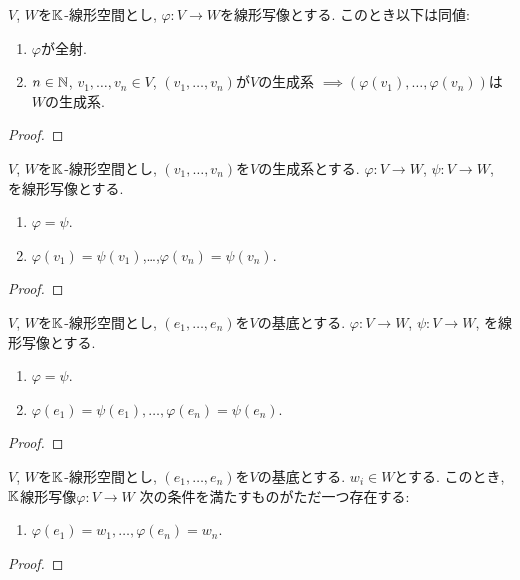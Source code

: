 \begin{prop}
  $V$, $W$を$\mathbb{K}$-線形空間とし,
  $\varphi\colon V\to W$を線形写像とする.
  このとき以下は同値:
  \begin{enumerate}
  \item $\varphi$が全射.
  \item $n\in \mathbb{N}$, $v_1,\ldots,v_n\in V$,
    $(v_1,\ldots,v_n)$が$V$の生成系
    $\implies (\varphi(v_1),\ldots,\varphi(v_n))$は$W$の生成系.
  \end{enumerate}
\end{prop}
\begin{proof}\end{proof}

\begin{prop}
  $V$, $W$を$\mathbb{K}$-線形空間とし,
  $(v_1,\ldots,v_n)$を$V$の生成系とする.
  $\varphi\colon V\to W$,
  $\psi\colon V\to W$,
  を線形写像とする.
  \begin{enumerate}
  \item $\varphi=\psi$.
  \item $\varphi(v_1)=\psi(v_1)$,\ldots,$\varphi(v_n)=\psi(v_n)$.
  \end{enumerate}
\end{prop}
\begin{proof}\end{proof}

\begin{cor}
  $V$, $W$を$\mathbb{K}$-線形空間とし,
  $(e_1,\ldots,e_n)$を$V$の基底とする.
  $\varphi\colon V\to W$,
  $\psi\colon V\to W$,
  を線形写像とする.
  \begin{enumerate}
  \item $\varphi=\psi$.
  \item $\varphi(e_1)=\psi(e_1),\ldots,\varphi(e_n)=\psi(e_n)$.
  \end{enumerate}
\end{cor}
\begin{proof}\end{proof}

\begin{cor}
  $V$, $W$を$\mathbb{K}$-線形空間とし,
  $(e_1,\ldots,e_n)$を$V$の基底とする.
  $w_i\in W$とする.
  このとき,
  $\mathbb{K}$線形写像$\varphi\colon V\to W$
  次の条件を満たすものがただ一つ存在する:
  \begin{enumerate}
  \item $\varphi(e_1)=w_1,\ldots,\varphi(e_n)=w_n$.
  \end{enumerate}
\end{cor}
\begin{proof}\end{proof}


